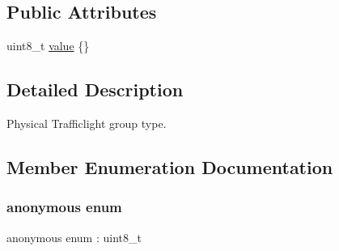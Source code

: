 \subsection*{Public Attributes}
\begin{DoxyCompactItemize}
\item 
uint8\+\_\+t \hyperlink{structmaf__perception__interface_1_1TrafficLightGroupEnum_a7a58b8b54910d0552711906cb05ccd6a}{value} \{\}
\end{DoxyCompactItemize}


\subsection{Detailed Description}
Physical Trafficlight group type. 

\subsection{Member Enumeration Documentation}
\mbox{\label{structmaf__perception__interface_1_1TrafficLightGroupEnum_a85bee6ced664e05589dc5067e5a483ea}} 
\subsubsection{\texorpdfstring{anonymous enum}{anonymous enum}}
{\footnotesize\ttfamily anonymous enum \+: uint8\+\_\+t}

